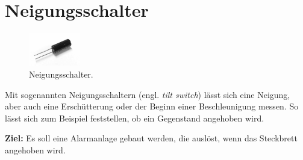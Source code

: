\newpage
\section{Neigungsschalter}
\label{sec:neigungsschalter}
\setcounter{aufgabennummer}{0}
\setcounter{projektnummer}{0}

\begin{figure}
	\centering
	\vspace{-\baselineskip}
	\includegraphics[width=0.2\textwidth]{./pics/neigungsschalter.png}
	\caption{Neigungsschalter.}
	\vspace{-\baselineskip}
\end{figure}
Mit sogenannten Neigungsschaltern (engl. \emph{tilt switch}) lässt sich eine Neigung, aber auch eine Erschütterung oder der Beginn einer Beschleunigung messen. So lässt sich zum Beispiel feststellen, ob ein Gegenstand angehoben wird.

\begin{ziel}
	\textbf{Ziel:} Es soll eine Alarmanlage gebaut werden, die auslöst, wenn das Steckbrett angehoben wird.
\end{ziel}

